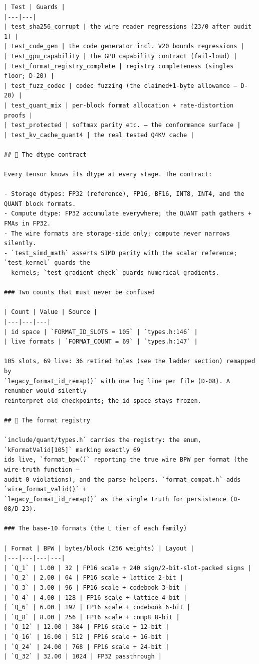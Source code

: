 \begin{Verbatim}[breaklines,breakanywhere,fontsize=\footnotesize]
| Test | Guards |
|---|---|
| test_sha256_corrupt | the wire reader regressions (23/0 after audit 1) |
| test_code_gen | the code generator incl. V20 bounds regressions |
| test_gpu_capability | the GPU capability contract (fail-loud) |
| test_format_registry_complete | registry completeness (singles floor; D-20) |
| test_fuzz_codec | codec fuzzing (the claimed+1-byte allowance — D-20) |
| test_quant_mix | per-block format allocation + rate-distortion proofs |
| test_protected | softmax parity etc. — the conformance surface |
| test_kv_cache_quant4 | the real tested Q4KV cache |

## 📐 The dtype contract

Every tensor knows its dtype at every stage. The contract:

- Storage dtypes: FP32 (reference), FP16, BF16, INT8, INT4, and the QUANT block formats.
- Compute dtype: FP32 accumulate everywhere; the QUANT path gathers + FMAs in FP32.
- The wire formats are storage-side only; compute never narrows silently.
- `test_simd_math` asserts SIMD parity with the scalar reference; `test_kernel` guards the
  kernels; `test_gradient_check` guards numerical gradients.

### Two counts that must never be confused

| Count | Value | Source |
|---|---|---|
| id space | `FORMAT_ID_SLOTS = 105` | `types.h:146` |
| live formats | `FORMAT_COUNT = 69` | `types.h:147` |

105 slots, 69 live: 36 retired holes (see the ladder section) remapped by
`legacy_format_id_remap()` with one log line per file (D-08). A renumber would silently
reinterpret old checkpoints; the id space stays frozen.

## 🧾 The format registry

`include/quant/types.h` carries the registry: the enum, `kFormatValid[105]` marking exactly 69
ids live, `format_bpw()` reporting the true wire BPW per format (the wire-truth function —
audit 0 violations), and the parse helpers. `format_compat.h` adds `wire_format_valid()` +
`legacy_format_id_remap()` as the single truth for persistence (D-08/D-23).

### The base-10 formats (the L tier of each family)

| Format | BPW | bytes/block (256 weights) | Layout |
|---|---|---|---|
| `Q_1` | 1.00 | 32 | FP16 scale + 240 sign/2-bit-slot-packed signs |
| `Q_2` | 2.00 | 64 | FP16 scale + lattice 2-bit |
| `Q_3` | 3.00 | 96 | FP16 scale + codebook 3-bit |
| `Q_4` | 4.00 | 128 | FP16 scale + lattice 4-bit |
| `Q_6` | 6.00 | 192 | FP16 scale + codebook 6-bit |
| `Q_8` | 8.00 | 256 | FP16 scale + comp8 8-bit |
| `Q_12` | 12.00 | 384 | FP16 scale + 12-bit |
| `Q_16` | 16.00 | 512 | FP16 scale + 16-bit |
| `Q_24` | 24.00 | 768 | FP16 scale + 24-bit |
| `Q_32` | 32.00 | 1024 | FP32 passthrough |


\end{Verbatim}
